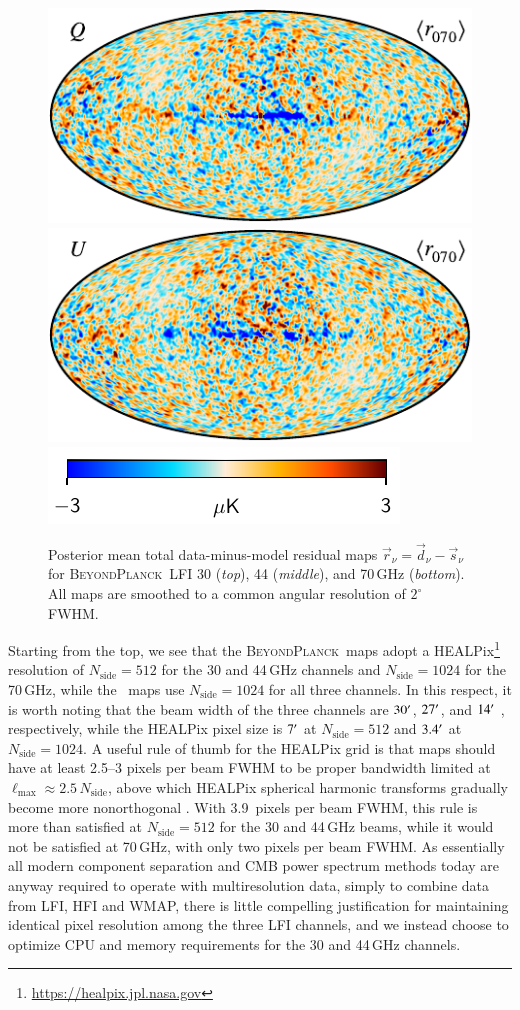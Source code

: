 \documentclass[twocolumn]{aa}
\def\WMAP{WMAP}
\renewcommand{\d}[0]{\vec{d}}
\newcommand{\s}[0]{\vec{s}}
\renewcommand{\r}[0]{\vec{r}}
\newcommand{\BP}{\textsc{BeyondPlanck}}
\begin{document}
\begin{figure}[t]
  \includegraphics[width=0.33\linewidth]{figs/BP_res_070_120arcmin_uK_v2_Q_MEAN_w8_n1024_c-planck.pdf}
  \includegraphics[width=0.33\linewidth]{figs/BP_res_070_120arcmin_uK_v2_U_MEAN_w8_n1024_c-planck.pdf}\\
  \includegraphics[width=0.33\linewidth]{figs/colourbar_3uK.pdf}
  \caption{Posterior mean total data-minus-model residual maps $\r_{\nu} = \d_{\nu}-\s_{\nu}$ for \BP\ LFI 30 (\emph{top}), 44 (\emph{middle}), and 70\,GHz (\emph{bottom}). All maps are smoothed to a common angular resolution of $2^{\circ}$ FWHM.}\label{fig:LFI_residuals}

\end{figure}

Starting from the top, we see that the \BP\ maps adopt a HEALPix\footnote{\url{https://healpix.jpl.nasa.gov}} \citep{gorski2005}
resolution of $N_{\mathrm{side}}=512$ for the 30 and 44\,GHz channels
and $N_{\mathrm{side}}=1024$ for the 70\,GHz, while the \Planck\ maps use
$N_{\mathrm{side}}=1024$ for all three channels. In this respect, it
is worth noting that the beam width of the three channels are
$30\arcm$, $27\arcm$, and $14\arcm$ \citep{planck2016-l02},
respectively, while the HEALPix pixel size is $7\arcm$ at
$N_{\mathrm{side}}=512$ and $3.4\arcm$ at $N_{\mathrm{side}}=1024$. A
useful rule of thumb for the HEALPix grid is that maps should have at
least 2.5--3 pixels per beam FWHM to be proper bandwidth limited at
$\ell_{\mathrm{max}}\approx 2.5\,N_{\mathrm{side}}$, above which
HEALPix spherical harmonic transforms gradually become more
nonorthogonal \citep{gorski2005}. With 3.9~pixels per beam FWHM, this
rule is more than satisfied at $N_{\mathrm{side}}=512$ for the 30 and
44\,GHz beams, while it would not be satisfied at 70\,GHz, with only
two pixels per beam FWHM. As essentially all modern component
separation and CMB power spectrum methods today are anyway required to
operate with multiresolution data, simply to combine data from LFI,
HFI and \WMAP, there is little compelling justification for
maintaining identical pixel resolution among the three LFI channels,
and we instead choose to optimize CPU and memory requirements for the
30 and 44\,GHz channels.
\end{document}
